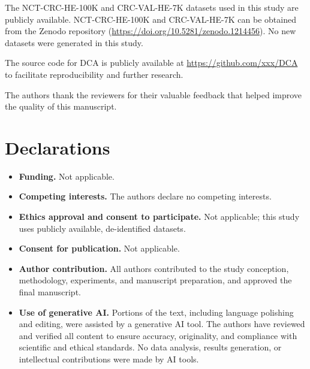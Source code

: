 
\backmatter

The NCT-CRC-HE-100K and CRC-VAL-HE-7K datasets used in this study are publicly available. NCT-CRC-HE-100K and CRC-VAL-HE-7K can be obtained from the Zenodo repository (\url{https://doi.org/10.5281/zenodo.1214456}). No new datasets were generated in this study.

The source code for DCA is publicly available at \url{https://github.com/xxx/DCA} to facilitate reproducibility and further research.

The authors thank the reviewers for their valuable feedback that helped improve the quality of this manuscript.

\section*{Declarations}

\begin{itemize}
\item \textbf{Funding.} Not applicable.
\item \textbf{Competing interests.} The authors declare no competing interests.
\item \textbf{Ethics approval and consent to participate.} Not applicable; this study uses publicly available, de-identified datasets.
\item \textbf{Consent for publication.} Not applicable.
\item \textbf{Author contribution.} All authors contributed to the study conception, methodology, experiments, and manuscript preparation, and approved the final manuscript.
\item \textbf{Use of generative AI.} Portions of the text, including language polishing and editing, were assisted by a generative AI tool. The authors have reviewed and verified all content to ensure accuracy, originality, and compliance with scientific and ethical standards. No data analysis, results generation, or intellectual contributions were made by AI tools.
\end{itemize}




